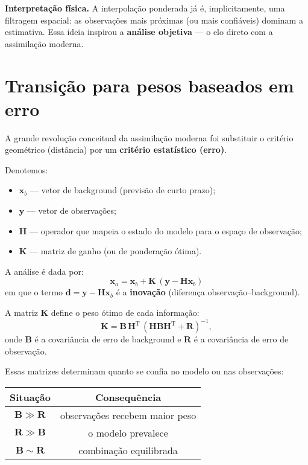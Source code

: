 \medskip
\noindent
\textbf{Interpretação física.}  
A interpolação ponderada já é, implicitamente, uma filtragem espacial: as observações mais próximas (ou mais confiáveis) dominam a estimativa.  
Essa ideia inspirou a \textbf{análise objetiva} \citep{Cressman1959,Barnes1964} --- o elo direto com a assimilação moderna.

\section{Transição para pesos baseados em erro}

A grande revolução conceitual da assimilação moderna foi substituir o critério geométrico (distância) por um \textbf{critério estatístico (erro)}.  

Denotemos:
\begin{itemize}
    \item \( \mathbf{x}_b \) --- vetor de background (previsão de curto prazo);
    \item \( \mathbf{y} \) --- vetor de observações;
    \item \( \mathbf{H} \) --- operador que mapeia o estado do modelo para o espaço de observação;
    \item \( \mathbf{K} \) --- matriz de ganho (ou de ponderação ótima).
\end{itemize}

A análise é dada por:
\begin{equation}
\boxed{
\mathbf{x}_a = \mathbf{x}_b + \mathbf{K}\,(\mathbf{y} - \mathbf{H}\mathbf{x}_b)
}
\label{eq:analysis}
\end{equation}
em que o termo \(\mathbf{d} = \mathbf{y} - \mathbf{H}\mathbf{x}_b\) é a \textbf{inovação} (diferença observação--background).

A matriz \(\mathbf{K}\) define o peso ótimo de cada informação:
\begin{equation}
\boxed{
\mathbf{K} = \mathbf{B}\,\mathbf{H}^\mathrm{T}\,
(\mathbf{H}\mathbf{B}\mathbf{H}^\mathrm{T} + \mathbf{R})^{-1}},
\label{eq:kalman_gain}
\end{equation}
onde  
\(\mathbf{B}\) é a covariância de erro de background e  
\(\mathbf{R}\) é a covariância de erro de observação.

Essas matrizes determinam quanto se confia no modelo ou nas observações:

\begin{center}
\begin{tabular}{|c|c|}
\hline
Situação & Consequência \\
\hline
\( \mathbf{B} \gg \mathbf{R} \) & observações recebem maior peso \\
\( \mathbf{R} \gg \mathbf{B} \) & o modelo prevalece \\
\( \mathbf{B} \sim \mathbf{R} \) & combinação equilibrada \\
\hline
\end{tabular}
\end{center}


